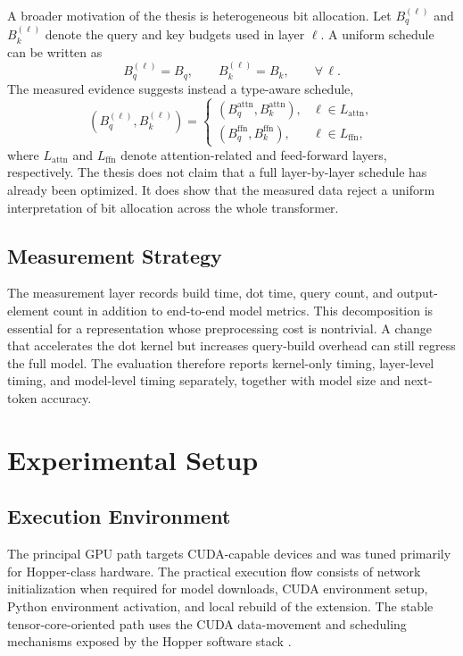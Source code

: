 A broader motivation of the thesis is heterogeneous bit allocation. Let $B_q^{(\ell)}$ and $B_k^{(\ell)}$ denote the query and key budgets used in layer $\ell$. A uniform schedule can be written as
\begin{equation}
    B_q^{(\ell)} = B_q, \qquad B_k^{(\ell)} = B_k, \qquad \forall\,\ell.
\end{equation}
The measured evidence suggests instead a type-aware schedule,
\begin{equation}
    (B_q^{(\ell)}, B_k^{(\ell)}) =
    \begin{cases}
        (B_q^{\mathrm{attn}}, B_k^{\mathrm{attn}}), & \ell \in L_{\mathrm{attn}}, \\
        (B_q^{\mathrm{ffn}}, B_k^{\mathrm{ffn}}), & \ell \in L_{\mathrm{ffn}},
    \end{cases}
\end{equation}
where $L_{\mathrm{attn}}$ and $L_{\mathrm{ffn}}$ denote attention-related and feed-forward layers, respectively. The thesis does not claim that a full layer-by-layer schedule has already been optimized. It does show that the measured data reject a uniform interpretation of bit allocation across the whole transformer.

\subsection{Measurement Strategy}
The measurement layer records build time, dot time, query count, and output-element count in addition to end-to-end model metrics. This decomposition is essential for a representation whose preprocessing cost is nontrivial. A change that accelerates the dot kernel but increases query-build overhead can still regress the full model. The evaluation therefore reports kernel-only timing, layer-level timing, and model-level timing separately, together with model size and next-token accuracy.

\section{Experimental Setup}\label{sec:experimental-setup}
\subsection{Execution Environment}
The principal GPU path targets CUDA-capable devices and was tuned primarily for Hopper-class hardware. The practical execution flow consists of network initialization when required for model downloads, CUDA environment setup, Python environment activation, and local rebuild of the extension. The stable tensor-core-oriented path uses the CUDA data-movement and scheduling mechanisms exposed by the Hopper software stack \cite{nvidia_cuda_guide,nvidia_hopper_tuning,nvidia_ptx_isa}.


